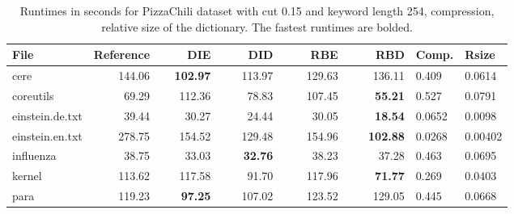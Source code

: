 \documentclass[english,twoside,censored,csm,algorithms-track-2020]{HYthesisML}
\theoremstyle{plain}
\theoremstyle{definition}
\begin{document}
\begin{center}
  \begin{table}
  \begin{tabular} {| l |r r r r r|l l|}
    \hline
    \textbf{File} & \textbf{Reference} & ~~~~\textbf{DIE} & ~~~~\textbf{DID} & ~~~~\textbf{RBE} & ~~~~\textbf{RBD} & \textbf{Comp.} & \textbf{Rsize} \\
    \hline
    cere & 144.06 & \textbf{102.97} & 113.97 & 129.63 & 136.11            & 0.409  & 0.0614  \\
    coreutils & 69.29 & 112.36 & 78.83 & 107.45 & \textbf{55.21}          & 0.527  & 0.0791  \\
    einstein.de.txt & 39.44 & 30.27 & 24.44 & 30.05 & \textbf{18.54}      & 0.0652 & 0.0098  \\
    einstein.en.txt & 278.75 & 154.52 & 129.48 & 154.96 & \textbf{102.88} & 0.0268 & 0.00402 \\
    influenza & 38.75 & 33.03 & \textbf{32.76} & 38.23 & 37.28            & 0.463  & 0.0695  \\
    kernel & 113.62 & 117.58 & 91.70 & 117.96 & \textbf{71.77}            & 0.269  & 0.0403  \\
    para & 119.23 & \textbf{97.25} & 107.02 & 123.52 & 129.05             & 0.445  & 0.0668  \\
    \hline
  \end{tabular}
  \caption{Runtimes in seconds for PizzaChili dataset with cut 0.15 and keyword length 254, compression, relative size of the dictionary. The fastest runtimes are bolded.}
  \label{runtimes-15-254}
  \end{table}
\end{center}
\end{document}
